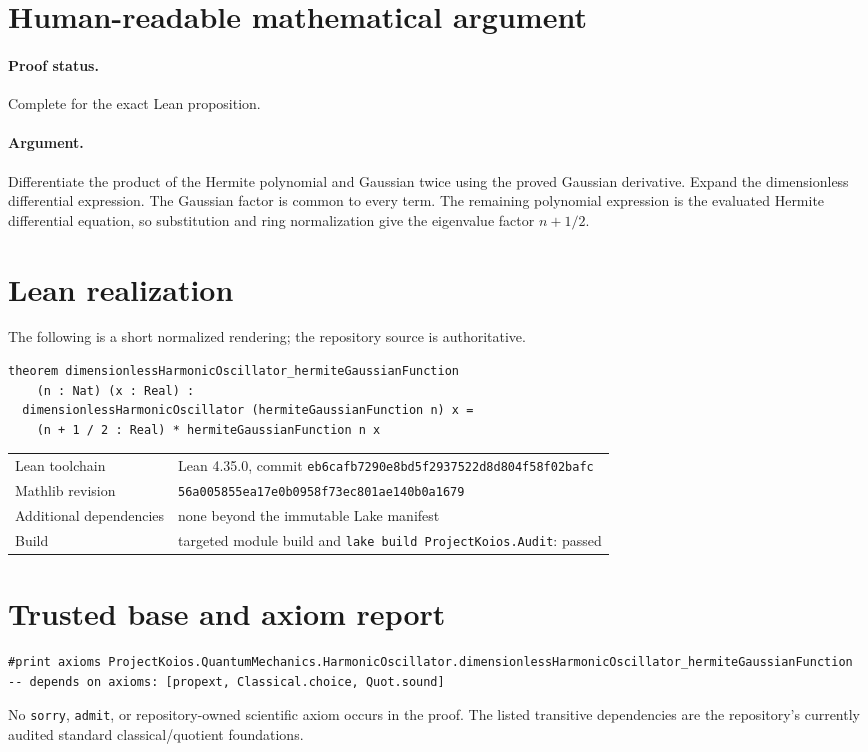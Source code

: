 \documentclass[11pt]{article}
\begin{document}
\section{Human-readable mathematical argument}
\paragraph{Proof status.} Complete for the exact Lean proposition.
\paragraph{Argument.} Differentiate the product of the Hermite polynomial and Gaussian twice using the proved Gaussian derivative. Expand the dimensionless differential expression. The Gaussian factor is common to every term. The remaining polynomial expression is the evaluated Hermite differential equation, so substitution and ring normalization give the eigenvalue factor $n+1/2$.

\section{Lean realization}
The following is a short normalized rendering; the repository source is authoritative.
\begin{lstlisting}
theorem dimensionlessHarmonicOscillator_hermiteGaussianFunction
    (n : Nat) (x : Real) :
  dimensionlessHarmonicOscillator (hermiteGaussianFunction n) x =
    (n + 1 / 2 : Real) * hermiteGaussianFunction n x
\end{lstlisting}
\begin{tabularx}{\textwidth}{@{}lY@{}}\toprule
Lean toolchain & Lean 4.35.0, commit \texttt{eb6cafb7290e8bd5f2937522d8d804f58f02bafc} \\
Mathlib revision & \texttt{56a005855ea17e0b0958f73ec801ae140b0a1679} \\
Additional dependencies & none beyond the immutable Lake manifest \\
Build & targeted module build and \texttt{lake build ProjectKoios.Audit}: passed \\
\bottomrule\end{tabularx}

\section{Trusted base and axiom report}
\begin{lstlisting}
#print axioms ProjectKoios.QuantumMechanics.HarmonicOscillator.dimensionlessHarmonicOscillator_hermiteGaussianFunction
-- depends on axioms: [propext, Classical.choice, Quot.sound]
\end{lstlisting}
No \texttt{sorry}, \texttt{admit}, or repository-owned scientific axiom occurs in the
proof. The listed transitive dependencies are the repository's currently audited standard
classical/quotient foundations.
\end{document}
